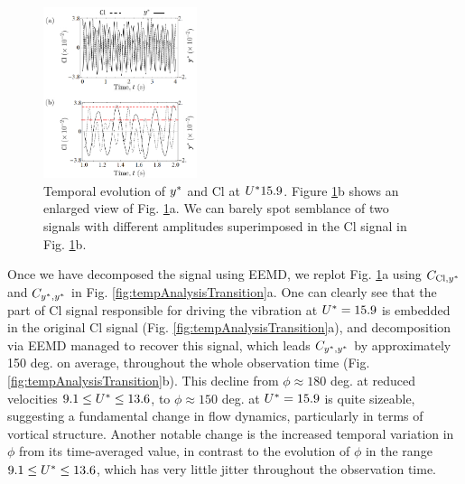\documentclass[oneside]{utmthesis}
\begin{document}
\begin{figure}
  \centering
  \includegraphics[width=0.4\textwidth]{figs/tempEvoCompare}
  \caption{Temporal evolution of $y^{*}$ and Cl at $U^{*} 15.9$. Figure \ref{fig:tempEvoCompare}b shows an enlarged view of Fig. \ref{fig:tempEvoCompare}a. We can barely spot semblance of two signals with different amplitudes superimposed in the Cl signal in Fig. \ref{fig:tempEvoCompare}b.} \label{fig:tempEvoCompare}
\end{figure}

Once we have decomposed the signal using EEMD, we replot Fig. \ref{fig:tempEvoCompare}a using $C_{\text{Cl},y^{*}}$ and $C_{y^{*},y^{*}}$ in Fig. \ref{fig:tempAnalysisTransition}a. One can clearly see that the part of Cl signal responsible for driving the vibration at  $U^{*} = 15.9$ is embedded in the original Cl signal (Fig. \ref{fig:tempAnalysisTransition}a), and decomposition via EEMD managed to recover this signal, which leads $C_{y^{*},y^{*}}$ by approximately 150 deg. on average, throughout the whole observation time (Fig. \ref{fig:tempAnalysisTransition}b). This decline from $\phi \approx 180$ deg. at reduced velocities $9.1 \leq U^{*} \leq 13.6$, to $\phi \approx 150$ deg. at $U^{*} = 15.9$ is quite sizeable, suggesting a fundamental change in flow dynamics, particularly in terms of vortical structure. Another notable change is the increased temporal variation in $\phi$ from its time-averaged value, in contrast to the evolution of $\phi$ in the range $9.1 \leq U^{*} \leq 13.6$, which has very little jitter throughout the observation time.
\end{document}
